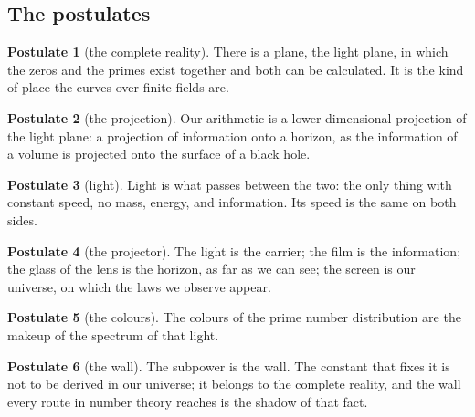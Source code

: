 \documentclass[11pt]{article}
\theoremstyle{definition}
\newtheorem{postulate}{Postulate}
\theoremstyle{remark}
\begin{document}
\subsection{The postulates}
\begin{postulate}[the complete reality]\label{p:reality}
There is a plane, the light plane, in which the zeros and the primes exist together and both can be calculated. It is the kind of place the curves over finite fields are.
\end{postulate}
\begin{postulate}[the projection]\label{p:projection}
Our arithmetic is a lower-dimensional projection of the light plane: a projection of information onto a horizon, as the information of a volume is projected onto the surface of a black hole.
\end{postulate}
\begin{postulate}[light]\label{p:light}
Light is what passes between the two: the only thing with constant speed, no mass, energy, and information. Its speed is the same on both sides.
\end{postulate}
\begin{postulate}[the projector]\label{p:projector}
The light is the carrier; the film is the information; the glass of the lens is the horizon, as far as we can see; the screen is our universe, on which the laws we observe appear.
\end{postulate}
\begin{postulate}[the colours]\label{p:colours}
The colours of the prime number distribution are the makeup of the spectrum of that light.
\end{postulate}
\begin{postulate}[the wall]\label{p:wall}
The subpower is the wall. The constant that fixes it is not to be derived in our universe; it belongs to the complete reality, and the wall every route in number theory reaches is the shadow of that fact.
\end{postulate}
\end{document}
